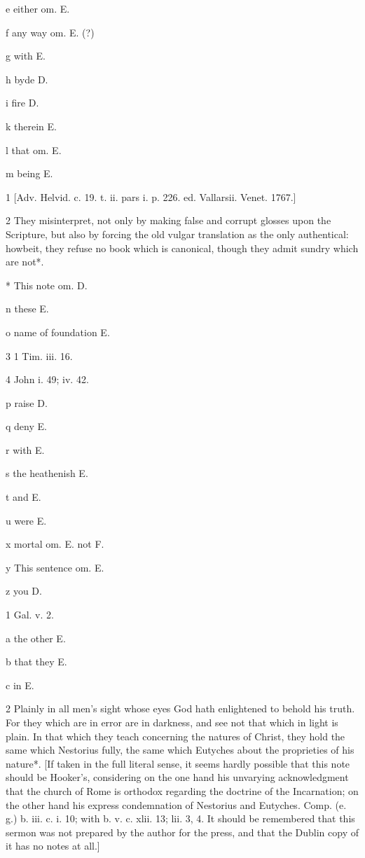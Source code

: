 e
either om. E.

f
any way om. E. (?)

g
with E.

h
byde D.

i
fire D.

k
therein E.

l
that om. E.

m
being E.

1
[Adv. Helvid. c. 19. t. ii. pars i. p. 226. ed. Vallarsii. Venet. 1767.]

2
They misinterpret, not only by making false and corrupt glosses upon the Scripture, but also by forcing the old vulgar translation as the only authentical: howbeit, they refuse no book which is canonical, though they admit sundry which are not*.

*
This note om. D.

n
these E.

o
name of foundation E.

3
1 Tim. iii. 16.

4
John i. 49; iv. 42.

p
raise D.

q
deny E.

r
with E.

s
the heathenish E.

t
and E.

u
were E.

x
mortal om. E. not F.

y
This sentence om. E.

z
you D.

1
Gal. v. 2.

a
the other E.

b
that they E.

c
in E.

2
Plainly in all men’s sight whose eyes God hath enlightened to behold his truth. For they which are in error are in darkness, and see not that which in light is plain. In that which they teach concerning the natures of Christ, they hold the same which Nestorius fully, the same which Eutyches about the proprieties of his nature*. [If taken in the full literal sense, it seems hardly possible that this note should be Hooker’s, considering on the one hand his unvarying acknowledgment that the church of Rome is orthodox regarding the doctrine of the Incarnation; on the other hand his express condemnation of Nestorius and Eutyches. Comp. (e. g.) b. iii. c. i. 10; with b. v. c. xlii. 13; lii. 3, 4. It should be remembered that this sermon was not prepared by the author for the press, and that the Dublin copy of it has no notes at all.]

